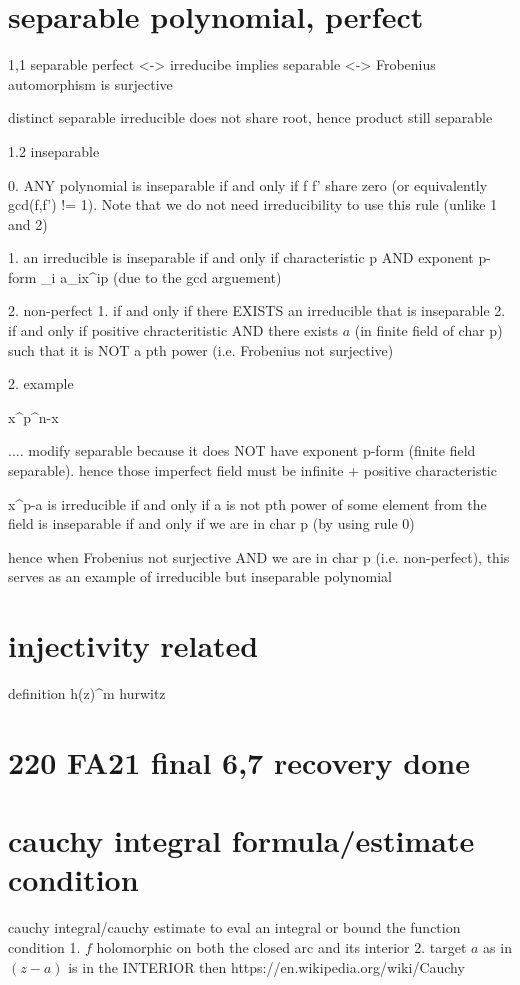 \section*{separable polynomial, perfect}

1,1 separable
    perfect <-> irreducibe implies separable
            <-> Frobenius automorphism is surjective
    
    distinct separable irreducible does not share root, hence product still separable
    
    
1.2 inseparable

    0. ANY polynomial is inseparable if and only if f f' share zero (or equivalently gcd(f,f') != 1). Note that we do not need irreducibility to use this rule (unlike 1 and 2)

    1. an irreducible is inseparable if and only if characteristic p AND exponent p-form \sum_i a_ix^{ip} (due to the gcd arguement)
        
    
    2. non-perfect
        1. if and only if there EXISTS an irreducible that is inseparable
        2. if and only if positive chracteritistic AND there exists $a$ (in finite field of char p) such that it is NOT a pth power (i.e. Frobenius not surjective)
        

2. example

    x^{p^n}-x 
    
    .... modify
        separable because it does NOT have exponent p-form (finite field separable). hence those imperfect field must be infinite + positive characteristic
    
    x^p-a 
        is irreducible if and only if a is not pth power of some element from the field
        is inseparable if and only if we are in char p (by using rule 0)
        
        hence when Frobenius not surjective AND we are in char p (i.e. non-perfect), this serves as an example of irreducible but inseparable polynomial
    

\section*{injectivity related}
    definition
    h(z)^m
    hurwitz
\section*{220 FA21 final 6,7 recovery done}


\section*{cauchy integral formula/estimate condition}
cauchy integral/cauchy estimate to eval an integral or bound the function
condition
1. $f$ holomorphic on both the closed arc and its interior
2. target $a$ as in $(z-a)$ is in the INTERIOR
then
https://en.wikipedia.org/wiki/Cauchy%



